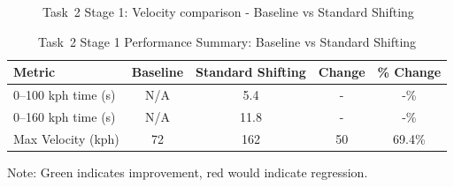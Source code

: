 \begin{figure}[H]
    \centering
    \caption{Task~2 Stage 1: Velocity comparison - Baseline vs Standard Shifting}
    \label{fig:task2_stage1_comparison}
\end{figure}

\begin{table}[H]
\centering
\caption{Task~2 Stage 1 Performance Summary: Baseline vs Standard Shifting}
\label{tab:task2_stage1_performance}
\small
\begin{tabular}{@{}lcccc@{}}
\toprule
\textbf{Metric} & \textbf{Baseline} & \textbf{Standard Shifting} & \textbf{Change} & \textbf{\% Change} \\
\midrule
0--100 kph time (s) & N/A & \textcolor{optimizedcolor}{5.4} & \textcolor{improvementcolor}{-} & \textcolor{improvementcolor}{-\%} \\
0--160 kph time (s) & N/A & \textcolor{optimizedcolor}{11.8} & \textcolor{improvementcolor}{-} & \textcolor{improvementcolor}{-\%} \\
Max Velocity (kph) & 72 & \textcolor{optimizedcolor}{162} & \textcolor{improvementcolor}{50} & \textcolor{improvementcolor}{69.4\%} \\
\bottomrule
\end{tabular}
\end{table}

Note: Green indicates improvement, red would indicate regression.

